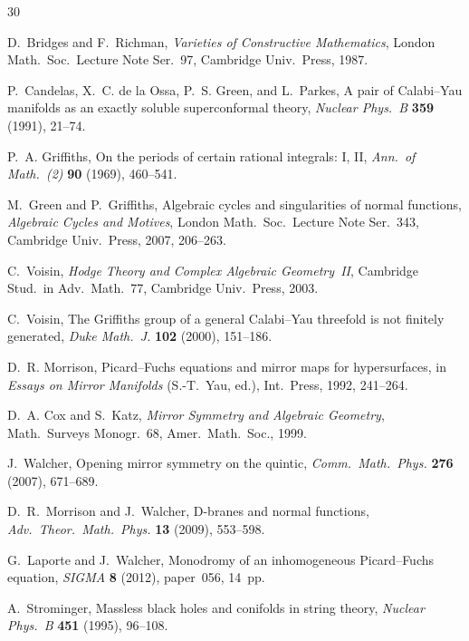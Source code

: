 \documentclass[11pt]{article}
\theoremstyle{plain}
\theoremstyle{definition}
\theoremstyle{remark}
\begin{document}
\begin{thebibliography}{30}

D.~Bridges and F.~Richman,
\emph{Varieties of Constructive Mathematics},
London Math.\ Soc.\ Lecture Note Ser.\ 97, Cambridge Univ.\ Press, 1987.

P.~Candelas, X.~C. de la Ossa, P.~S. Green, and L.~Parkes,
A pair of Calabi--Yau manifolds as an exactly soluble superconformal theory,
\emph{Nuclear Phys.\ B} \textbf{359} (1991), 21--74.

P.~A. Griffiths,
On the periods of certain rational integrals: I, II,
\emph{Ann.\ of Math.\ (2)} \textbf{90} (1969), 460--541.

M.~Green and P.~Griffiths,
Algebraic cycles and singularities of normal functions,
\emph{Algebraic Cycles and Motives}, London Math.\ Soc.\ Lecture Note Ser.\ 343, Cambridge Univ.\ Press, 2007, 206--263.

C.~Voisin,
\emph{Hodge Theory and Complex Algebraic Geometry~II},
Cambridge Stud.\ in Adv.\ Math.\ 77, Cambridge Univ.\ Press, 2003.

C.~Voisin,
The Griffiths group of a general Calabi--Yau threefold is not finitely generated,
\emph{Duke Math.\ J.} \textbf{102} (2000), 151--186.

D.~R. Morrison,
Picard--Fuchs equations and mirror maps for hypersurfaces,
in \emph{Essays on Mirror Manifolds} (S.-T.\ Yau, ed.), Int.\ Press, 1992, 241--264.

D.~A. Cox and S.~Katz,
\emph{Mirror Symmetry and Algebraic Geometry},
Math.\ Surveys Monogr.\ 68, Amer.\ Math.\ Soc., 1999.

J.~Walcher,
Opening mirror symmetry on the quintic,
\emph{Comm.\ Math.\ Phys.} \textbf{276} (2007), 671--689.

D.~R.~Morrison and J.~Walcher,
D-branes and normal functions,
\emph{Adv.\ Theor.\ Math.\ Phys.} \textbf{13} (2009), 553--598.

G.~Laporte and J.~Walcher,
Monodromy of an inhomogeneous Picard--Fuchs equation,
\emph{SIGMA} \textbf{8} (2012), paper~056, 14~pp.

A.~Strominger,
Massless black holes and conifolds in string theory,
\emph{Nuclear Phys.\ B} \textbf{451} (1995), 96--108.


\end{thebibliography}
\end{document}

